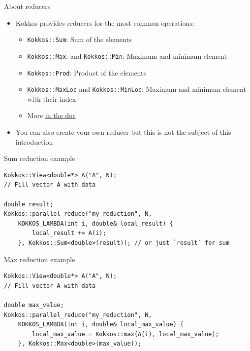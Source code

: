 \documentclass[aspectratio=169]{beamer}
\begin{document}
\begin{frame}{About reducers}
    \begin{itemize}
        \item Kokkos provides reducers for the most common operations:
        \begin{itemize}
            \item \texttt{Kokkos::Sum}: Sum of the elements
            \item \texttt{Kokkos::Max}: and \texttt{Kokkos::Min}: Maximum and minimum element
            \item \texttt{Kokkos::Prod}: Product of the elements
            \item \texttt{Kokkos::MaxLoc} and \texttt{Kokkos::MinLoc}: Maximum and minimum element with their index
            \item More \href{https://kokkos.org/kokkos-core-wiki/ProgrammingGuide/Custom-Reductions-Built-In-Reducers.html}{in the doc}
        \end{itemize}
        \item You can also create your own reducer but this is not the subject of this introduction
    \end{itemize}
\end{frame}


\begin{frame}[fragile]{Sum reduction example}
    \begin{verbatim}
Kokkos::View<double*> A("A", N);
// Fill vector A with data

double result;
Kokkos::parallel_reduce("my_reduction", N,
    KOKKOS_LAMBDA(int i, double& local_result) {
        local_result += A(i);
    }, Kokkos::Sum<double>(result)); // or just `result` for sum
    \end{verbatim}
\end{frame}


\begin{frame}[fragile]{Max reduction example}
    \begin{verbatim}
Kokkos::View<double*> A("A", N);
// Fill vector A with data

double max_value;
Kokkos::parallel_reduce("my_reduction", N,
    KOKKOS_LAMBDA(int i, double& local_max_value) {
        local_max_value = Kokkos::max(A(i), local_max_value);
    }, Kokkos::Max<double>(max_value));
    \end{verbatim}
\end{frame}
\end{document}

